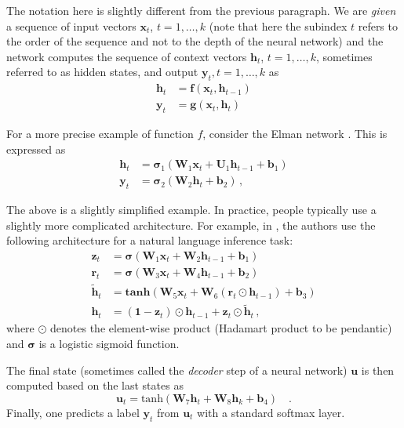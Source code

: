 \documentclass[paper=a4, fontsize=11pt,twoside, abstracton]{scrartcl}
\def\xx{{\boldsymbol x}}
\def\uu{{\boldsymbol u}}
\def\yy{{\boldsymbol y}}
\def\hh{{\boldsymbol h}}
\def\WW{{\boldsymbol W}}
\def\zz{{\boldsymbol z}}
\def\bb{{\boldsymbol b}}
\def\ssigma{{\boldsymbol \sigma}}
\begin{document}
The notation here is slightly different from the previous paragraph. We are \emph{given} a sequence of input vectors $\xx_{t}$, $t=1, \ldots, k$ (note that here the subindex $t$ refers to the order of the sequence and not to the depth of the neural network) and the network computes the sequence of context vectors $\hh_{t}$, $t=1, \ldots, k$, sometimes referred to as hidden states, and output $\yy_t, t=1,\ldots, k$ as
\begin{align}
  \hh_t &= \boldsymbol{f}(\xx_t, \hh_{t-1})  \\
  \yy_t &= \boldsymbol{g}(\xx_t, \hh_t)
\end{align}

 For a more precise example of function $f$, consider the Elman network \citep{elman1990finding}. This is expressed as
  \begin{align}
    \hh_{t} &= \ssigma_1(\WW_1 \xx_t + \boldsymbol{U}_1 \hh_{t-1} + \boldsymbol{b}_1)  \\
    \yy_t &= \ssigma_2(\WW_2\hh_t + \boldsymbol{b}_2)\,,
  \end{align}

The above is a slightly simplified example. In practice, people typically use a slightly more complicated architecture. For example, in \citep{cho2014learning}, the authors use the following architecture for a natural language inference task:
  \begin{align}
    \zz_t &= \ssigma(\WW_1 \xx_t + \WW_2 \hh_{t-1} + \bb_1) \\
    \boldsymbol{r}_t &= \ssigma(\WW_3 \xx_t + \WW_4 \hh_{t-1} + \bb_2) \\
    \tilde{\hh}_t &= \textbf{tanh}(\WW_5 \xx_t + \WW_6 (\boldsymbol{r}_t  \odot \hh_{t-1}) + \bb_3) \\
    \hh_t &= (\boldsymbol{1} - \zz_t) \odot \hh_{t-1} + \zz_t \odot\tilde{\hh}_t\,,
  \end{align}
where $\odot$ denotes the element-wise product (Hadamart product to be pendantic) and $\ssigma$ is a logistic sigmoid function.

The final state (sometimes called the \emph{decoder} step of a neural network) $\boldsymbol u$ is then computed based on the last states as
\begin{equation}\label{eq:rnn_prediction}
  \uu_t = \text{tanh}(\WW_7 \hh_t + \WW_8 \hh_k + \bb_4) \quad.
\end{equation}
Finally, one predicts a label $\yy_{t}$ from $\uu_t$ with a standard softmax layer.
\end{document}
